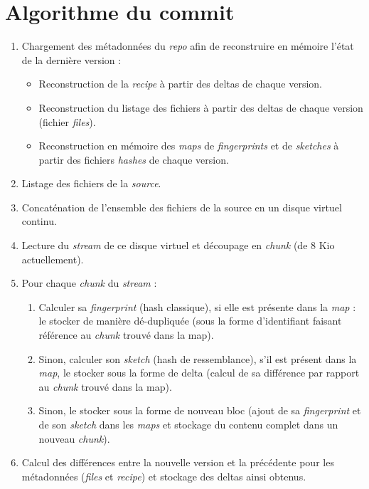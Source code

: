 \documentclass[a4paper]{report}
\begin{document}
\section{Algorithme du commit}

\begin{enumerate}
\item
  Chargement des métadonnées du \emph{repo} afin de reconstruire en
  mémoire l'état de la dernière version :

  \begin{itemize}
  \item
    Reconstruction de la \emph{recipe} à partir des deltas de chaque
    version.
  \item
    Reconstruction du listage des fichiers à partir des deltas de chaque
    version (fichier \emph{files}).
  \item
    Reconstruction en mémoire des \emph{maps} de \emph{fingerprints} et
    de \emph{sketches} à partir des fichiers \emph{hashes} de chaque
    version.
  \end{itemize}
\item
  Listage des fichiers de la \emph{source}.
\item
  Concaténation de l'ensemble des fichiers de la source en un disque
  virtuel continu.
\item
  Lecture du \emph{stream} de ce disque virtuel et découpage en
  \emph{chunk} (de 8 Kio actuellement).
\item
  Pour chaque \emph{chunk} du \emph{stream} :

  \begin{enumerate}
  \item
    Calculer sa \emph{fingerprint} (hash classique), si elle est
    présente dans la \emph{map} : le stocker de manière dé-dupliquée
    (sous la forme d'identifiant faisant référence au \emph{chunk}
    trouvé dans la map).
  \item
    Sinon, calculer son \emph{sketch} (hash de ressemblance), s'il est
    présent dans la \emph{map}, le stocker sous la forme de delta
    (calcul de sa différence par rapport au \emph{chunk} trouvé dans la
    map).
  \item
    Sinon, le stocker sous la forme de nouveau bloc (ajout de sa
    \emph{fingerprint} et de son \emph{sketch} dans les \emph{maps} et
    stockage du contenu complet dans un nouveau \emph{chunk}).
  \end{enumerate}
\item
  Calcul des différences entre la nouvelle version et la précédente pour
  les métadonnées (\emph{files} et \emph{recipe}) et stockage des deltas
  ainsi obtenus.
\end{enumerate}
\end{document}
